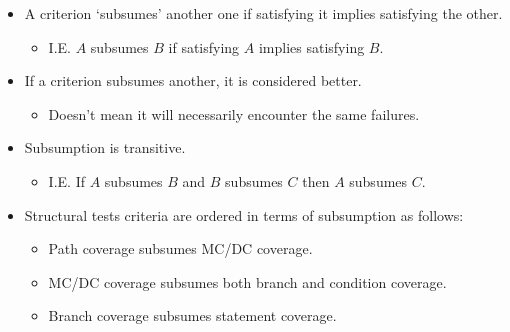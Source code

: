 \documentclass{article}
\begin{document}
\begin{itemize}
\begin{itemize}
		\item An eventual success.
		\item An immediate failure.
	\end{itemize}
	\item A criterion `subsumes' another one if satisfying it implies satisfying the other.
	\begin{itemize}
		\item I.E. $A$ subsumes $B$ if satisfying $A$ implies satisfying $B$.
	\end{itemize}
	\item If a criterion subsumes another, it is considered better.
	\begin{itemize}
		\item Doesn't mean it will necessarily encounter the same failures.
	\end{itemize}
	\item Subsumption is transitive.
	\begin{itemize}
		\item I.E. If $A$ subsumes $B$ and $B$ subsumes $C$ then $A$ subsumes $C$.
	\end{itemize}
	\item Structural tests criteria are ordered in terms of subsumption as follows:
	\begin{itemize}
		\item Path coverage subsumes MC/DC coverage.
		\item MC/DC coverage subsumes both branch and condition coverage.
		\item Branch coverage subsumes statement coverage.
	\end{itemize}
\end{itemize}

\begin{center}
\end{center}
\end{document}
